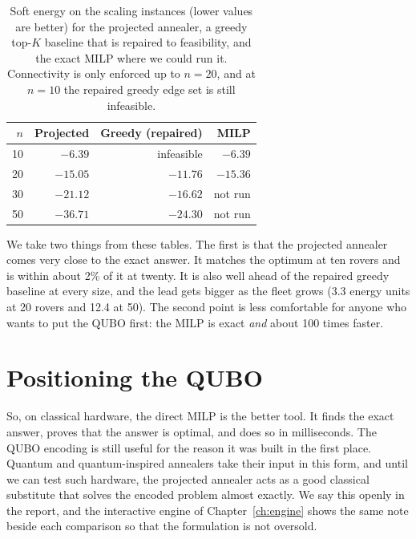\begin{table}[htbp]
\centering
\caption[Soft energy on the scaling instances.]{Soft energy on the scaling instances (lower values
are better) for the projected annealer, a greedy top-$K$ baseline that is
repaired to feasibility, and the exact MILP where we could run it.
Connectivity is only enforced up to $n=20$, and at $n=10$ the repaired greedy
edge set is still infeasible.}
\label{tab:exact:scaling}
\small
\begin{tabular}{@{}r r r r@{}}
\toprule
$n$ & Projected & Greedy (repaired) & MILP \\
\midrule
10 & $-6.39$ & infeasible & $-6.39$ \\
20 & $-15.05$ & $-11.76$ & $-15.36$ \\
30 & $-21.12$ & $-16.62$ & not run \\
50 & $-36.71$ & $-24.30$ & not run \\
\bottomrule
\end{tabular}
\end{table}

We take two things from these tables. The first is that the projected
annealer comes very close to the exact answer. It matches the optimum at ten
rovers and is within about 2\% of it at twenty. It is also well ahead of the
repaired greedy baseline at every size, and the lead gets bigger as the fleet
grows (3.3 energy units at 20 rovers and 12.4 at 50). The second point is less
comfortable for anyone who wants to put the QUBO first: the MILP is exact
\emph{and} about 100 times faster.

\section{Positioning the QUBO}

So, on classical hardware, the direct MILP is the better tool. It finds the
exact answer, proves that the answer is optimal, and does so in milliseconds.
The QUBO encoding is still useful for the reason it was built in the first
place. Quantum and quantum-inspired annealers take their input in this form,
and until we can test such hardware, the projected annealer acts as a good
classical substitute that solves the encoded problem almost exactly. We say
this openly in the report, and the interactive engine of
Chapter~\ref{ch:engine} shows the same note beside each comparison so that the
formulation is not oversold.
